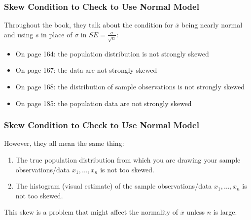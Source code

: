 \documentclass[handout]{beamer}
\newcommand{\blue}[1]{\textcolor{blue2}{#1}}
\newcommand{\xbar}{\overline{x}}
\begin{document}
\begin{frame}
\frametitle{Skew Condition to Check to Use Normal Model}
Throughout the book, they talk about the condition for $\xbar$ being nearly normal and using $s$ in place of $\sigma$ in $SE=\frac{\sigma}{\sqrt{n}}$:

\vspace{0.25cm}

\begin{itemize}
\pause\item On page 164: the population distribution is not strongly skewed
\pause\item On page 167: the data are not strongly skewed
\pause\item On page 168: the distribution of sample observations is not strongly skewed
\pause\item On page 185: the population data are not strongly skewed
\end{itemize}

\end{frame}


\begin{frame}
\frametitle{Skew Condition to Check to Use Normal Model}
However, they all mean the same thing:

\begin{enumerate}
\pause\item The \blue{true population} distribution from which you are drawing your sample observations/data $x_1, \ldots, x_n$ is not too skewed.  
\pause\item The histogram (visual estimate) of the sample observations/data $x_1, \ldots, x_n$ is not too skewed.  
\end{enumerate}

\vspace{0.25cm}

\pause This skew is a problem that might affect the normality of $\xbar$ \blue{unless $n$ is large}.

\end{frame}
\end{document}
